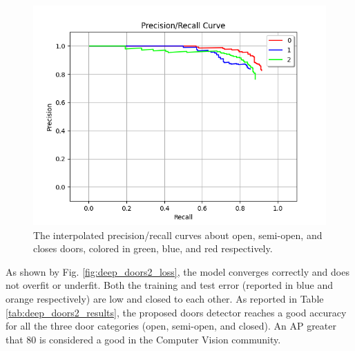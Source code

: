 \begin{figure}[h!]
	\centering
	\includegraphics[width=\linewidth]{images/deep_doors_2_precision_recall.png}
	\caption{The interpolated precision/recall curves about open, semi-open, and closes doors, colored in green, blue, and red respectively.}
	\label{fig:deep_doors2_ap_plot}
\end{figure} 

As shown by Fig. \ref{fig:deep_doors2_loss}, the model converges correctly and does not overfit or underfit. Both the training and test error (reported in blue and orange respectively) are low and closed to each other. As reported in Table \ref{tab:deep_doors2_results}, the proposed doors detector reaches a good accuracy for all the three door categories (open, semi-open, and closed). An AP greater that 80 is considered a good in the Computer Vision community.

